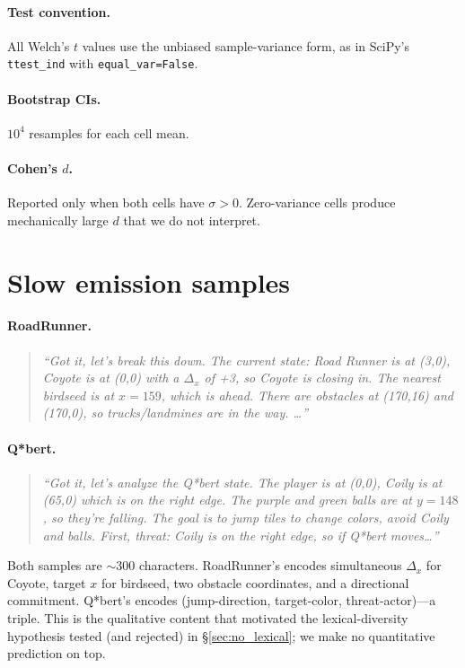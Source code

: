 \documentclass[11pt]{article}
\begin{document}
\paragraph{Test convention.} All Welch's $t$ values use the unbiased sample-variance form, as in SciPy's \texttt{ttest\_ind} with \texttt{equal\_var=False}.

\paragraph{Bootstrap CIs.} $10^4$ resamples for each cell mean.

\paragraph{Cohen's $d$.} Reported only when both cells have $\sigma>0$. Zero-variance cells produce mechanically large $d$ that we do not interpret.

\section{Slow emission samples}
\label{app:emissions}

\paragraph{RoadRunner.}
\begin{quote}\small\textit{``Got it, let's break this down. The current state: Road Runner is at (3,0), Coyote is at (0,0) with a $\Delta_x$ of +3, so Coyote is closing in. The nearest birdseed is at $x=159$, which is ahead. There are obstacles at (170,16) and (170,0), so trucks/landmines are in the way. \dots''}\end{quote}

\paragraph{Q*bert.}
\begin{quote}\small\textit{``Got it, let's analyze the Q*bert state. The player is at (0,0), Coily is at (65,0) which is on the right edge. The purple and green balls are at $y=148$, so they're falling. The goal is to jump tiles to change colors, avoid Coily and balls. First, threat: Coily is on the right edge, so if Q*bert moves\dots''}\end{quote}

Both samples are $\sim$300 characters. RoadRunner's encodes simultaneous $\Delta_x$ for Coyote, target $x$ for birdseed, two obstacle coordinates, and a directional commitment. Q*bert's encodes (jump-direction, target-color, threat-actor)---a triple. This is the qualitative content that motivated the lexical-diversity hypothesis tested (and rejected) in \S\ref{sec:no_lexical}; we make no quantitative prediction on top.
\end{document}
